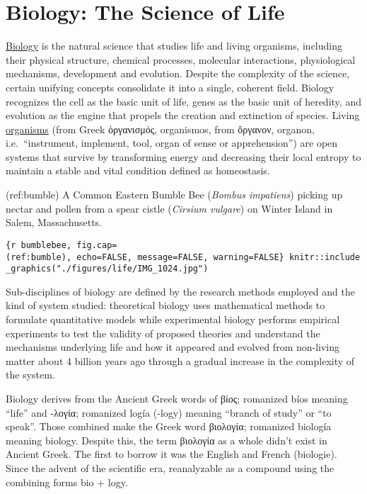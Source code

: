 \documentclass[
]{article}
\author{}
\date{}
\begin{document}
\hypertarget{biology-the-science-of-life}{%
\section{Biology: The Science of
Life}\label{biology-the-science-of-life}}

\href{https://en.wikipedia.org/wiki/Biology}{Biology} is the natural
science that studies life and living organisms, including their physical
structure, chemical processes, molecular interactions, physiological
mechanisms, development and evolution. Despite the complexity of the
science, certain unifying concepts consolidate it into a single,
coherent field. Biology recognizes the cell as the basic unit of life,
genes as the basic unit of heredity, and evolution as the engine that
propels the creation and extinction of species. Living
\href{https://en.wikipedia.org/wiki/Organism}{organisms} (from Greek
ὀργανισμός, organismos, from ὄργανον, organon, i.e.~``instrument,
implement, tool, organ of sense or apprehension'') are open systems that
survive by transforming energy and decreasing their local entropy to
maintain a stable and vital condition defined as homeostasis.

(ref:bumble) A Common Eastern Bumble Bee (\emph{Bombus impatiens})
picking up nectar and pollen from a spear cistle (\emph{Cirsium
vulgare}) on Winter Island in Salem, Massachusetts.

\texttt{\{r\ bumblebee,\ fig.cap=\textquotesingle{}(ref:bumble)\textquotesingle{},\ echo=FALSE,\ message=FALSE,\ warning=FALSE\}\ knitr::include\_graphics("./figures/life/IMG\_1024.jpg")}

Sub-disciplines of biology are defined by the research methods employed
and the kind of system studied: theoretical biology uses mathematical
methods to formulate quantitative models while experimental biology
performs empirical experiments to test the validity of proposed theories
and understand the mechanisms underlying life and how it appeared and
evolved from non-living matter about 4 billion years ago through a
gradual increase in the complexity of the system.

Biology derives from the Ancient Greek words of βίος; romanized bíos
meaning ``life'' and -λογία; romanized logía (-logy) meaning ``branch of
study'' or ``to speak''. Those combined make the Greek word βιολογία;
romanized biología meaning biology. Despite this, the term βιολογία as a
whole didn't exist in Ancient Greek. The first to borrow it was the
English and French (biologie). Since the advent of the scientific era,
reanalyzable as a compound using the combining forms bio + logy.
\end{document}
